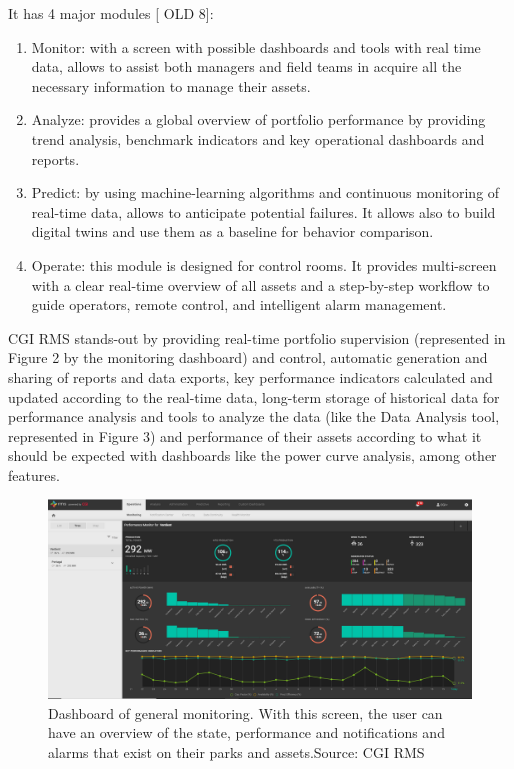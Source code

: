 It has 4 major modules [ OLD 8]:
\begin{enumerate}
\item
Monitor: with a screen with possible dashboards and tools with real time data, allows to assist both managers and field teams in acquire all the necessary information to manage their assets.

\item
Analyze: provides a global overview of portfolio performance by providing trend analysis, benchmark indicators and key operational dashboards and reports.

\item
Predict: by using machine-learning algorithms and continuous monitoring of real-time data, allows to anticipate potential failures. It allows also to build digital twins and use them as a baseline for behavior comparison.

\item
Operate: this module is designed for control rooms. It provides multi-screen with a clear real-time overview of all assets and a step-by-step workflow to guide operators, remote control, and intelligent alarm management.
\end{enumerate}

CGI RMS stands-out by providing real-time portfolio supervision (represented in Figure 2 by the monitoring dashboard) and control, automatic generation and sharing of reports and data exports, key performance indicators calculated and updated according to the real-time data, long-term storage of historical data for performance analysis and tools to analyze the data (like the Data Analysis tool, represented in Figure 3) and performance of their assets according to what it should be expected with dashboards like the power curve analysis, among other features.

\begin{figure}[htbp]
	\centering
	\includegraphics[width=\textwidth]{Chapters/Figures/background_fig2.PNG}
	\caption{Dashboard of general monitoring. With this screen, the user can have an overview of the state, performance and notifications and alarms that exist on their parks and assets.Source: CGI RMS}
	\label{fig:Figuras_Tree_silhouettes-vectorial}
\end{figure}



